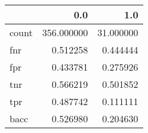 \begin{tabular}{lrr}
\toprule
{} &         0.0 &        1.0 \\
\midrule
count &  356.000000 &  31.000000 \\
fnr   &    0.512258 &   0.444444 \\
fpr   &    0.433781 &   0.275926 \\
tnr   &    0.566219 &   0.501852 \\
tpr   &    0.487742 &   0.111111 \\
bacc  &    0.526980 &   0.204630 \\
\bottomrule
\end{tabular}
